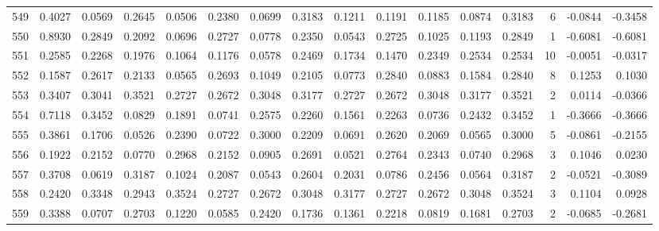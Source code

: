 \begin{tabular}{lrrrrrrrrrrrrrrr}
549 &      0.4027 &  0.0569 &  0.2645 &  0.0506 &  0.2380 &  0.0699 &  0.3183 &  0.1211 &  0.1191 &  0.1185 &   0.0874 &     0.3183 &      6 &                   -0.0844 &                    -0.3458 \\
550 &      0.8930 &  0.2849 &  0.2092 &  0.0696 &  0.2727 &  0.0778 &  0.2350 &  0.0543 &  0.2725 &  0.1025 &   0.1193 &     0.2849 &      1 &                   -0.6081 &                    -0.6081 \\
551 &      0.2585 &  0.2268 &  0.1976 &  0.1064 &  0.1176 &  0.0578 &  0.2469 &  0.1734 &  0.1470 &  0.2349 &   0.2534 &     0.2534 &     10 &                   -0.0051 &                    -0.0317 \\
552 &      0.1587 &  0.2617 &  0.2133 &  0.0565 &  0.2693 &  0.1049 &  0.2105 &  0.0773 &  0.2840 &  0.0883 &   0.1584 &     0.2840 &      8 &                    0.1253 &                     0.1030 \\
553 &      0.3407 &  0.3041 &  0.3521 &  0.2727 &  0.2672 &  0.3048 &  0.3177 &  0.2727 &  0.2672 &  0.3048 &   0.3177 &     0.3521 &      2 &                    0.0114 &                    -0.0366 \\
554 &      0.7118 &  0.3452 &  0.0829 &  0.1891 &  0.0741 &  0.2575 &  0.2260 &  0.1561 &  0.2263 &  0.0736 &   0.2432 &     0.3452 &      1 &                   -0.3666 &                    -0.3666 \\
555 &      0.3861 &  0.1706 &  0.0526 &  0.2390 &  0.0722 &  0.3000 &  0.2209 &  0.0691 &  0.2620 &  0.2069 &   0.0565 &     0.3000 &      5 &                   -0.0861 &                    -0.2155 \\
556 &      0.1922 &  0.2152 &  0.0770 &  0.2968 &  0.2152 &  0.0905 &  0.2691 &  0.0521 &  0.2764 &  0.2343 &   0.0740 &     0.2968 &      3 &                    0.1046 &                     0.0230 \\
557 &      0.3708 &  0.0619 &  0.3187 &  0.1024 &  0.2087 &  0.0543 &  0.2604 &  0.2031 &  0.0786 &  0.2456 &   0.0564 &     0.3187 &      2 &                   -0.0521 &                    -0.3089 \\
558 &      0.2420 &  0.3348 &  0.2943 &  0.3524 &  0.2727 &  0.2672 &  0.3048 &  0.3177 &  0.2727 &  0.2672 &   0.3048 &     0.3524 &      3 &                    0.1104 &                     0.0928 \\
559 &      0.3388 &  0.0707 &  0.2703 &  0.1220 &  0.0585 &  0.2420 &  0.1736 &  0.1361 &  0.2218 &  0.0819 &   0.1681 &     0.2703 &      2 &                   -0.0685 &                    -0.2681 \\

\end{tabular}
